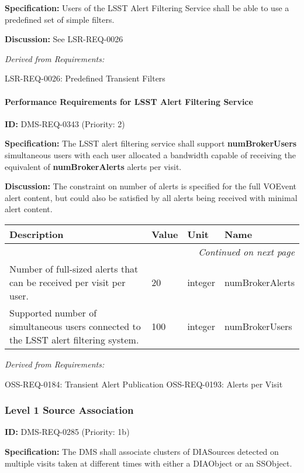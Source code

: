 \documentclass[SE,toc,lsstdraft]{lsstdoc}
\makeatletter
\newcommand{\paramname}[1]{\hspace{0pt}#1}
\newcommand{\unitname}[1]{\hspace{0pt}#1}
\newenvironment{parameters}[0]{%
\setlength\LTleft{0pt}
\setlength\LTright{\fill}
\begin{small}
\begin{longtable}[]{|p{0.49\textwidth}|l|p{0.6in}|p{1.70in}@{}|}

\hline \textbf{Description} & \textbf{Value} & \textbf{Unit} & \textbf{Name} \\ \hline
\endhead

\hline \multicolumn{4}{r}{\emph{Continued on next page}} \\
\endfoot

\hline\hline
\endlastfoot
}{%
\hline
\end{longtable}
\end{small}
}
\makeatother
\begin{document}
\textbf{Specification: }Users of the LSST Alert Filtering Service shall be able to use a predefined set of simple filters.

\textbf{Discussion:} See LSR-REQ-0026

\emph{Derived from Requirements:}

LSR-REQ-0026:
Predefined Transient Filters \newline

\paragraph{Performance Requirements for LSST Alert Filtering Service}\hfill  %

\label{DMS-REQ-0343}
\textbf{ID:} DMS-REQ-0343 (Priority: 2)

\textbf{Specification:} The LSST alert filtering service shall support \textbf{numBrokerUsers} simultaneous users with each user allocated a bandwidth capable of receiving the equivalent of \textbf{numBrokerAlerts} alerts per visit.

\textbf{Discussion:} The constraint on number of alerts is specified for the full VOEvent alert content, but could also be satisfied by all alerts being received with minimal alert content.

\begin{parameters}
 Number of full-sized alerts that can be received per visit per user.
&
20
&
\unitname{%
integer
}
&
\paramname{%
numBrokerAlerts
} \\\hline
Supported number of simultaneous users connected to the LSST alert filtering system.
&
100
&
\unitname{%
integer
}
&
\paramname{%
numBrokerUsers
} \\\hline
\end{parameters}

\emph{Derived from Requirements:}

OSS-REQ-0184:
Transient Alert Publication \newline
OSS-REQ-0193:
Alerts per Visit \newline

\subsubsection{Level 1 Source Association}

\label{DMS-REQ-0285}
\textbf{ID:} DMS-REQ-0285 (Priority: 1b)

\textbf{Specification:} The DMS shall associate clusters of DIASources detected on multiple visits taken at different times with either a DIAObject or an SSObject.
\end{document}
